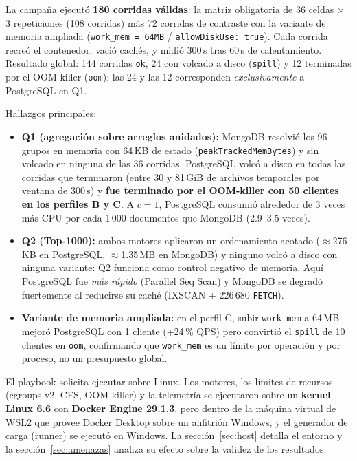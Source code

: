 \documentclass[11pt,a4paper]{article}
\begin{document}
La campaña ejecutó \textbf{180 corridas válidas}: la matriz obligatoria de 36 celdas $\times$ 3 repeticiones (108 corridas) más 72 corridas de contraste con la variante de memoria ampliada (\texttt{work\_mem = 64MB} / \texttt{allowDiskUse: true}). Cada corrida recreó el contenedor, vació cachés, y midió 300\,s tras 60\,s de calentamiento. Resultado global: 144 corridas \texttt{ok}, 24 con volcado a disco (\texttt{spill}) y 12 terminadas por el OOM-killer (\texttt{oom}); las 24 y las 12 corresponden \emph{exclusivamente} a PostgreSQL en Q1.

Hallazgos principales:
\begin{itemize}
  \item \textbf{Q1 (agregación sobre arreglos anidados):} MongoDB resolvió los 96 grupos en memoria con 64\,KB de estado (\texttt{peakTrackedMemBytes}) y sin volcado en ninguna de las 36 corridas. PostgreSQL volcó a disco en todas las corridas que terminaron (entre 30 y 81\,GiB de archivos temporales por ventana de 300\,s) y \textbf{fue terminado por el OOM-killer con 50 clientes en los perfiles B y C}. A $c=1$, PostgreSQL consumió alrededor de 3 veces más CPU por cada 1\,000 documentos que MongoDB (2.9--3.5 veces).
  \item \textbf{Q2 (Top-1000):} ambos motores aplicaron un ordenamiento acotado ($\approx$276\,KB en PostgreSQL, $\approx$1.35\,MB en MongoDB) y ninguno volcó a disco con ninguna variante: Q2 funciona como control negativo de memoria. Aquí PostgreSQL fue \emph{más rápido} (Parallel Seq Scan) y MongoDB se degradó fuertemente al reducirse su caché (IXSCAN + 226\,680 \texttt{FETCH}).
  \item \textbf{Variante de memoria ampliada:} en el perfil C, subir \texttt{work\_mem} a 64\,MB mejoró PostgreSQL con 1 cliente (+24\,\% QPS) pero convirtió el \texttt{spill} de 10 clientes en \texttt{oom}, confirmando que \texttt{work\_mem} es un límite por operación y por proceso, no un presupuesto global.
\end{itemize}

\begin{desviacion}
El playbook solicita ejecutar sobre Linux. Los motores, los límites de recursos (cgroups v2, CFS, OOM-killer) y la telemetría se ejecutaron sobre un \textbf{kernel Linux 6.6} con \textbf{Docker Engine 29.1.3}, pero dentro de la máquina virtual de WSL2 que provee Docker Desktop sobre un anfitrión Windows, y el generador de carga (runner) se ejecutó en Windows. La sección~\ref{sec:host} detalla el entorno y la sección~\ref{sec:amenazas} analiza su efecto sobre la validez de los resultados.
\end{desviacion}
\end{document}
